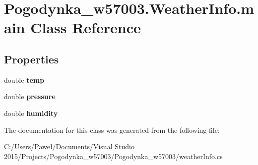 \hypertarget{class_pogodynka__w57003_1_1_weather_info_1_1main}{}\section{Pogodynka\+\_\+w57003.\+Weather\+Info.\+main Class Reference}
\label{class_pogodynka__w57003_1_1_weather_info_1_1main}
\subsection*{Properties}
\begin{DoxyCompactItemize}
\item 
\mbox{\label{class_pogodynka__w57003_1_1_weather_info_1_1main_a5120c22c35a0da4b5eb20aa939885211}} 
double {\bfseries temp}
\item 
\mbox{\label{class_pogodynka__w57003_1_1_weather_info_1_1main_acdf846f787b99c43f66eaaa2a0ce01ce}} 
double {\bfseries pressure}
\item 
\mbox{\label{class_pogodynka__w57003_1_1_weather_info_1_1main_a73edaa1d4e96d6d43e82ab379eceaac5}} 
double {\bfseries humidity}
\end{DoxyCompactItemize}


The documentation for this class was generated from the following file\+:\begin{DoxyCompactItemize}
\item 
C\+:/\+Users/\+Paweł/\+Documents/\+Visual Studio 2015/\+Projects/\+Pogodynka\+\_\+w57003/\+Pogodynka\+\_\+w57003/weather\+Info.\+cs\end{DoxyCompactItemize}
